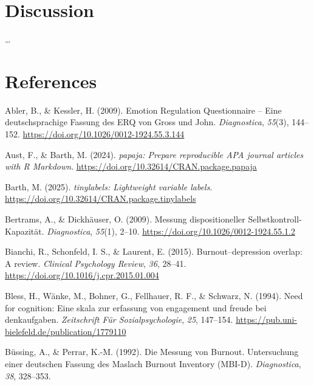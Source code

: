 \documentclass[
  man]{apa6}
\newlength{\cslhangindent}
\newenvironment{CSLReferences}[2] %
 {\begin{list}{}{%
  \setlength{\itemindent}{0pt}
  \setlength{\leftmargin}{0pt}
  \setlength{\parsep}{0pt}
  \ifodd #1
   \setlength{\leftmargin}{\cslhangindent}
   \setlength{\itemindent}{-1\cslhangindent}
  \fi
  \setlength{\itemsep}{#2\baselineskip}}}
 {\end{list}}
\begin{document}
\section{Discussion}\label{discussion}

\ldots{}

\newpage

\section{References}\label{references}

\label{refs}
\begin{CSLReferences}{1}{0}
Abler, B., \& Kessler, H. (2009). {Emotion Regulation Questionnaire -- Eine deutschsprachige Fassung des ERQ von Gross und John}. \emph{Diagnostica}, \emph{55}(3), 144--152. \url{https://doi.org/10.1026/0012-1924.55.3.144}

Aust, F., \& Barth, M. (2024). \emph{{papaja}: {Prepare} reproducible {APA} journal articles with {R Markdown}}. \url{https://doi.org/10.32614/CRAN.package.papaja}

Barth, M. (2025). \emph{{tinylabels}: Lightweight variable labels}. \url{https://doi.org/10.32614/CRAN.package.tinylabels}

Bertrams, A., \& Dickhäuser, O. (2009). {Messung dispositioneller Selbstkontroll-Kapazität}. \emph{Diagnostica}, \emph{55}(1), 2--10. \url{https://doi.org/10.1026/0012-1924.55.1.2}

Bianchi, R., Schonfeld, I. S., \& Laurent, E. (2015). Burnout--depression overlap: A review. \emph{Clinical Psychology Review}, \emph{36}, 28--41. \url{https://doi.org/10.1016/j.cpr.2015.01.004}

Bless, H., Wänke, M., Bohner, G., Fellhauer, R. F., \& Schwarz, N. (1994). Need for cognition: Eine skala zur erfassung von engagement und freude bei denkaufgaben. \emph{Zeitschrift Für Sozialpsychologie}, \emph{25}, 147--154. \url{https://pub.uni-bielefeld.de/publication/1779110}

Büssing, A., \& Perrar, K.-M. (1992). Die {Messung von Burnout. Untersuchung einer deutschen Fassung des Maslach Burnout Inventory (MBI-D)}. \emph{Diagnostica}, \emph{38}, 328--353.


\end{CSLReferences}
\end{document}
